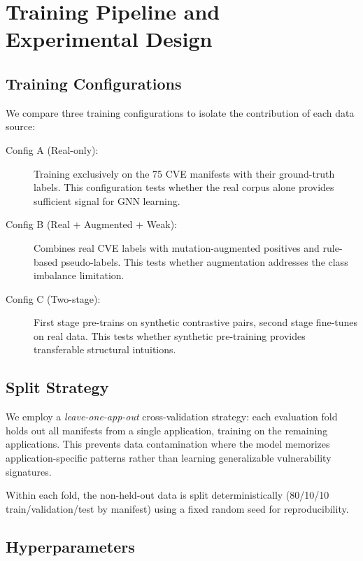 \section{Training Pipeline and Experimental Design}
\label{sec:training}

\subsection{Training Configurations}

We compare three training configurations to isolate the contribution of each data source:

\begin{description}
    \item[Config A (Real-only):] Training exclusively on the 75 CVE manifests with their ground-truth labels. This configuration tests whether the real corpus alone provides sufficient signal for GNN learning.

    \item[Config B (Real + Augmented + Weak):] Combines real CVE labels with mutation-augmented positives and rule-based pseudo-labels. This tests whether augmentation addresses the class imbalance limitation.

    \item[Config C (Two-stage):] First stage pre-trains on synthetic contrastive pairs, second stage fine-tunes on real data. This tests whether synthetic pre-training provides transferable structural intuitions.
\end{description}

\subsection{Split Strategy}

We employ a \emph{leave-one-app-out} cross-validation strategy: each evaluation fold holds out all manifests from a single application, training on the remaining applications. This prevents data contamination where the model memorizes application-specific patterns rather than learning generalizable vulnerability signatures.

Within each fold, the non-held-out data is split deterministically (80/10/10 train/validation/test by manifest) using a fixed random seed for reproducibility.

\subsection{Hyperparameters}

